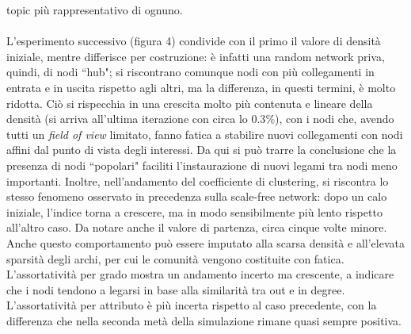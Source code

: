 \documentclass[a4paper,12pt]{article}
\begin{document}
topic più rappresentativo di ognuno.\\ \\
L'esperimento successivo (figura 4) condivide con il primo il valore di densità iniziale, mentre differisce per costruzione: è infatti una random network priva, quindi, di nodi ``hub"; si riscontrano comunque nodi con più collegamenti in entrata e in uscita rispetto agli altri, ma la differenza, in questi termini, è molto ridotta. Ciò si rispecchia in una crescita molto più contenuta e lineare della densità (si arriva all'ultima iterazione con circa lo $0.3\%$), con i nodi che, avendo tutti un \textit{field of view} limitato, fanno fatica a stabilire nuovi collegamenti con nodi affini dal punto di vista degli interessi. Da qui si può trarre la conclusione che la presenza di nodi ``popolari" faciliti l'instaurazione di nuovi legami tra nodi meno importanti.
Inoltre, nell'andamento del coefficiente di clustering, si riscontra lo stesso fenomeno osservato in precedenza sulla scale-free network: dopo un calo iniziale, l'indice torna a crescere, ma in modo sensibilmente più lento rispetto all'altro caso. Da notare anche il valore di partenza, circa cinque volte minore. Anche questo comportamento può essere imputato alla scarsa densità e all'elevata sparsità degli archi, per cui le comunità vengono costituite con fatica. L'assortatività per grado mostra un andamento incerto ma crescente, a indicare che i nodi tendono a legarsi in base alla similarità tra out e in degree. L'assortatività per attributo è più incerta rispetto al caso precedente, con la differenza che nella seconda metà della simulazione rimane quasi sempre positiva.
\end{document}

